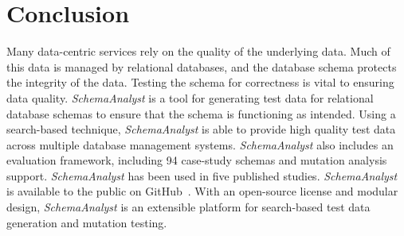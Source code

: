 \section{Conclusion}

Many data-centric services rely on the quality of the underlying data. Much of this data
is managed by relational databases, and the database schema protects the integrity of the data.
Testing the schema for correctness is vital to ensuring data quality. \textit{SchemaAnalyst} is a
tool for generating test data for relational database schemas to ensure that the schema is functioning 
as intended. Using a search-based technique, \textit{SchemaAnalyst} is able to provide high quality test
data across multiple database management systems. \textit{SchemaAnalyst} also includes an evaluation
framework, including 94 case-study schemas and mutation analysis support. \textit{SchemaAnalyst} has been
used in five published studies.
\textit{SchemaAnalyst} is available to the public on
GitHub~\cite{tool}. With an open-source license and modular design, \textit{SchemaAnalyst} is an extensible
platform for search-based test data generation and mutation testing.
